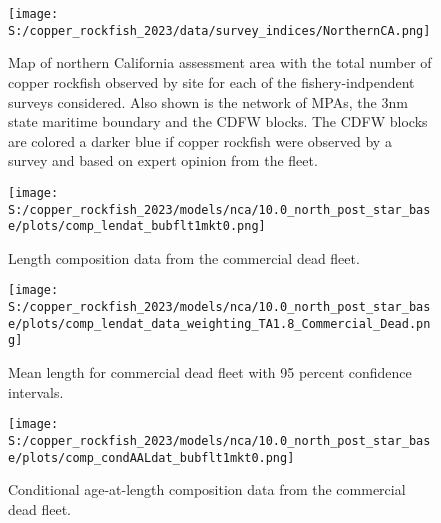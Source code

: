 \documentclass[11pt,
  letterpaper,
]{article}
\begin{document}
\FloatBarrier

\begin{figure}
{\centering
\texttt{[image: S:/copper\_rockfish\_2023/data/survey\_indices/NorthernCA.png]}
}
\caption{Map of northern California assessment area with the total number of copper rockfish observed by site for each of the fishery-indpendent surveys considered. Also shown is the network of MPAs, the 3nm state maritime boundary and the CDFW blocks. The CDFW blocks are colored a darker blue if copper rockfish were observed by a survey and based on expert opinion from the fleet.\label{fig:survey-map}}
\end{figure}

\begin{figure}
{\centering
\texttt{[image: S:/copper\_rockfish\_2023/models/nca/10.0\_north\_post\_star\_base/plots/comp\_lendat\_bubflt1mkt0.png]}
}
\caption{Length composition data from the commercial dead fleet.\label{fig:com-dead-len-data}}
\end{figure}

\begin{figure}
{\centering
\texttt{[image: S:/copper\_rockfish\_2023/models/nca/10.0\_north\_post\_star\_base/plots/comp\_lendat\_data\_weighting\_TA1.8\_Commercial\_Dead.png]}
}
\caption{Mean length for commercial dead fleet with 95 percent confidence intervals.\label{fig:mean-com-dead-len-data}}
\end{figure}

\begin{figure}
{\centering
\texttt{[image: S:/copper\_rockfish\_2023/models/nca/10.0\_north\_post\_star\_base/plots/comp\_condAALdat\_bubflt1mkt0.png]}
}
\caption{Conditional age-at-length composition data from the commercial dead fleet.\label{fig:com-dead-age-data}}
\end{figure}
\end{document}

